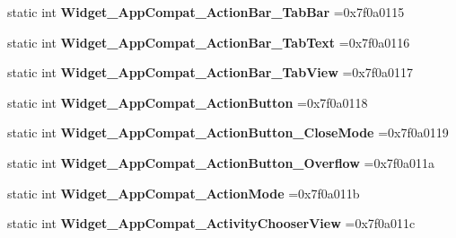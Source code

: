 \begin{DoxyCompactItemize}
static int {\bfseries Widget\+\_\+\+App\+Compat\+\_\+\+Action\+Bar\+\_\+\+Tab\+Bar} =0x7f0a0115
\item 
\mbox{\label{classandroid_1_1support_1_1graphics_1_1drawable_1_1R_1_1style_a8bbaa635c65206d35fd6abe43b02c018}} 
static int {\bfseries Widget\+\_\+\+App\+Compat\+\_\+\+Action\+Bar\+\_\+\+Tab\+Text} =0x7f0a0116
\item 
\mbox{\label{classandroid_1_1support_1_1graphics_1_1drawable_1_1R_1_1style_a669af28c5b75ec2dcb32c508cccc7640}} 
static int {\bfseries Widget\+\_\+\+App\+Compat\+\_\+\+Action\+Bar\+\_\+\+Tab\+View} =0x7f0a0117
\item 
\mbox{\label{classandroid_1_1support_1_1graphics_1_1drawable_1_1R_1_1style_ae0e529cc5548fc06e032f5458ffa0fe4}} 
static int {\bfseries Widget\+\_\+\+App\+Compat\+\_\+\+Action\+Button} =0x7f0a0118
\item 
\mbox{\label{classandroid_1_1support_1_1graphics_1_1drawable_1_1R_1_1style_a72f0cb6895c791f3622b27532fea488d}} 
static int {\bfseries Widget\+\_\+\+App\+Compat\+\_\+\+Action\+Button\+\_\+\+Close\+Mode} =0x7f0a0119
\item 
\mbox{\label{classandroid_1_1support_1_1graphics_1_1drawable_1_1R_1_1style_a6acd6bf076a75a14f3c12f3391f65f62}} 
static int {\bfseries Widget\+\_\+\+App\+Compat\+\_\+\+Action\+Button\+\_\+\+Overflow} =0x7f0a011a
\item 
\mbox{\label{classandroid_1_1support_1_1graphics_1_1drawable_1_1R_1_1style_a024dfbf06f620b245d214a059dd9e8d3}} 
static int {\bfseries Widget\+\_\+\+App\+Compat\+\_\+\+Action\+Mode} =0x7f0a011b
\item 
\mbox{\label{classandroid_1_1support_1_1graphics_1_1drawable_1_1R_1_1style_a5486cdaa7f476360efa61dd0bb086917}} 
static int {\bfseries Widget\+\_\+\+App\+Compat\+\_\+\+Activity\+Chooser\+View} =0x7f0a011c

\end{DoxyCompactItemize}
